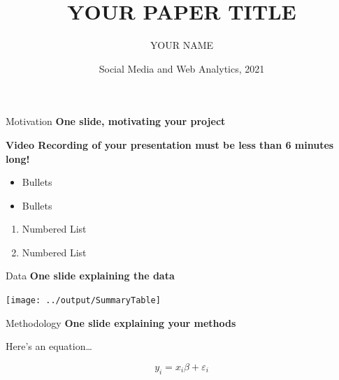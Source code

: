 \documentclass[
  ignorenonframetext,
]{beamer}
\title{YOUR PAPER TITLE}
\author{YOUR NAME}
\date{Social Media and Web Analytics, 2021}
\providecommand{\tightlist}{%
  \setlength{\itemsep}{0pt}\setlength{\parskip}{0pt}}
\begin{document}
\frame{\titlepage}

\begin{frame}{Motivation}
\protect\hypertarget{motivation}{}
\textbf{One slide, motivating your project}

\textbf{Video Recording of your presentation must be less than 6 minutes
long!}

\begin{itemize}
\tightlist
\item
  Bullets
\item
  Bullets
\end{itemize}

\begin{enumerate}
\tightlist
\item
  Numbered List
\item
  Numbered List
\end{enumerate}
\end{frame}

\begin{frame}{Data}
\protect\hypertarget{data}{}
\textbf{One slide explaining the data}

\begin{center}\texttt{[image: ../output/SummaryTable]} \end{center}
\end{frame}

\begin{frame}{Methodology}
\protect\hypertarget{methodology}{}
\textbf{One slide explaining your methods}

Here's an equation\ldots{}

\[
y_i = x_i \beta + \varepsilon_i
\]
\end{frame}
\end{document}
